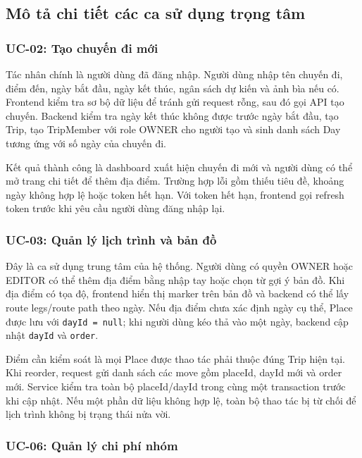 \documentclass[a4paper]{report}
\begin{document}
\subsection{Mô tả chi tiết các ca sử dụng trọng tâm}

\subsubsection{UC-02: Tạo chuyến đi mới}

Tác nhân chính là người dùng đã đăng nhập. Người dùng nhập tên chuyến đi, điểm đến, ngày bắt đầu, ngày kết thúc, ngân sách dự kiến và ảnh bìa nếu có. Frontend kiểm tra sơ bộ dữ liệu để tránh gửi request rỗng, sau đó gọi API tạo chuyến. Backend kiểm tra ngày kết thúc không được trước ngày bắt đầu, tạo Trip, tạo TripMember với role OWNER cho người tạo và sinh danh sách Day tương ứng với số ngày của chuyến đi.

Kết quả thành công là dashboard xuất hiện chuyến đi mới và người dùng có thể mở trang chi tiết để thêm địa điểm. Trường hợp lỗi gồm thiếu tiêu đề, khoảng ngày không hợp lệ hoặc token hết hạn. Với token hết hạn, frontend gọi refresh token trước khi yêu cầu người dùng đăng nhập lại.

\subsubsection{UC-03: Quản lý lịch trình và bản đồ}

Đây là ca sử dụng trung tâm của hệ thống. Người dùng có quyền OWNER hoặc EDITOR có thể thêm địa điểm bằng nhập tay hoặc chọn từ gợi ý bản đồ. Khi địa điểm có tọa độ, frontend hiển thị marker trên bản đồ và backend có thể lấy route legs/route path theo ngày. Nếu địa điểm chưa xác định ngày cụ thể, Place được lưu với \texttt{dayId = null}; khi người dùng kéo thả vào một ngày, backend cập nhật \texttt{dayId} và \texttt{order}.

Điểm cần kiểm soát là mọi Place được thao tác phải thuộc đúng Trip hiện tại. Khi reorder, request gửi danh sách các move gồm placeId, dayId mới và order mới. Service kiểm tra toàn bộ placeId/dayId trong cùng một transaction trước khi cập nhật. Nếu một phần dữ liệu không hợp lệ, toàn bộ thao tác bị từ chối để lịch trình không bị trạng thái nửa vời.

\subsubsection{UC-06: Quản lý chi phí nhóm}
\end{document}

